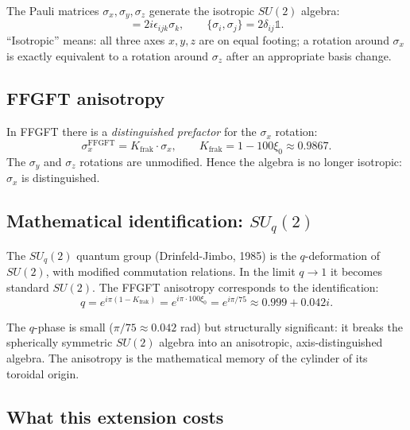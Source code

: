The Pauli matrices $\sigma_x, \sigma_y, \sigma_z$ generate the
isotropic $SU(2)$ algebra:
\begin{equation}
  [\sigma_i, \sigma_j] = 2i\epsilon_{ijk}\sigma_k,
  \qquad
  \{\sigma_i, \sigma_j\} = 2\delta_{ij}\mathbb{1}.
\end{equation}
\enquote{Isotropic} means: all three axes $x, y, z$ are on equal
footing; a rotation around $\sigma_x$ is exactly equivalent to a
rotation around $\sigma_z$ after an appropriate basis change.

\subsection{FFGFT anisotropy}

In FFGFT there is a \emph{distinguished prefactor} for the $\sigma_x$
rotation:
\begin{equation}
  \sigma_x^{\text{FFGFT}} = K_{\text{frak}} \cdot \sigma_x,
  \qquad
  K_{\text{frak}} = 1 - 100\xi_0 \approx 0.9867.
\end{equation}
The $\sigma_y$ and $\sigma_z$ rotations are unmodified. Hence the
algebra is no longer isotropic: $\sigma_x$ is distinguished.

\subsection{Mathematical identification: $SU_q(2)$}

The $SU_q(2)$ quantum group (Drinfeld-Jimbo, 1985) is the
$q$-deformation of $SU(2)$, with modified commutation relations.
In the limit $q \to 1$ it becomes standard $SU(2)$. The FFGFT
anisotropy corresponds to the identification:
\begin{equation}
  \boxed{
    q = e^{i\pi(1 - K_{\text{frak}})}
      = e^{i\pi \cdot 100\xi_0}
      = e^{i\pi/75}
      \approx 0.999 + 0.042i.
  }
\end{equation}

The $q$-phase is small ($\pi/75 \approx 0.042$ rad) but
structurally significant: it breaks the spherically symmetric
$SU(2)$ algebra into an anisotropic, axis-distinguished algebra. The
anisotropy is the mathematical memory of the cylinder of its
toroidal origin.

\subsection{What this extension costs}

